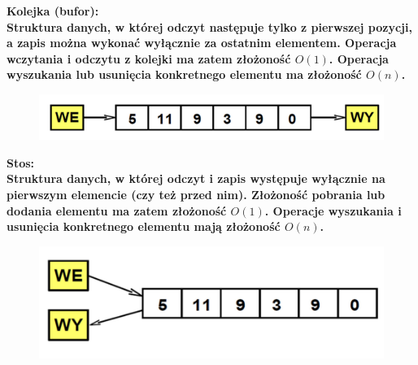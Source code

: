 \documentclass[a4paper,12pt]{article}
\newcommand{\h}[1]{\noindent \bf #1 \rm \\ \noindent}
\begin{document}
\h{Kolejka (bufor):}
Struktura danych, w której odczyt następuje tylko z pierwszej pozycji, a zapis można wykonać wyłącznie za ostatnim elementem. Operacja wczytania i odczytu z kolejki ma zatem złożoność $O(1)$. Operacja wyszukania lub usunięcia konkretnego elementu ma złożoność $O(n)$.

\begin{figure}[H]
	\centering
	\includegraphics[width=14cm]{kolejka.png}
\end{figure}

\newpage
\h{Stos:}
Struktura danych, w której odczyt i zapis występuje wyłącznie na pierwszym elemencie (czy też przed nim). Złożoność pobrania lub dodania elementu ma zatem złożoność $O(1)$. Operacje wyszukania i usunięcia konkretnego elementu mają złożoność $O(n)$.
\begin{figure}[H]
	\centering
	\includegraphics[width=14cm]{stos.png}
\end{figure}
\end{document}

